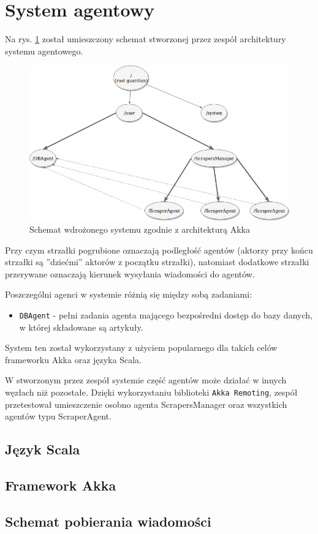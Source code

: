 \section{System agentowy}
Na rys. \ref{fig:actor} został umieszczony schemat stworzonej przez zespół architektury systemu agentowego.
\begin{figure}[!htb]
\centering
\includegraphics[width=1.0\textwidth]{./pict/actors.png}
\caption{Schemat wdrożonego systemu zgodnie z architekturą Akka}
\label{fig:actor}
\end{figure}

\par Przy czym strzałki pogrubione oznaczają podległość agentów (aktorzy przy końcu strzałki są ''dziećmi'' aktorów z początku strzałki), natomiast dodatkowe strzałki przerywane oznaczają kierunek wysyłania wiadomości do agentów.

\par Poszczególni agenci w systemie różnią się między sobą zadaniami:
\begin{itemize}
	\item \texttt{DBAgent} - pełni zadania agenta mającego bezpośredni dostęp do bazy danych, w której składowane są artykuły. 
\end{itemize}

\par System ten został wykorzystany z użyciem popularnego dla takich celów frameworku Akka oraz języka Scala.

W stworzonym przez zespół systemie część agentów może działać w innych węzłach niż pozostałe. Dzięki wykorzystaniu biblioteki \texttt{Akka Remoting}, zespół przetestował umieszczenie osobno agenta ScrapersManager oraz wszystkich agentów typu ScraperAgent.

\subsection{Język Scala}

\subsection{Framework Akka}

\subsection{Schemat pobierania wiadomości}